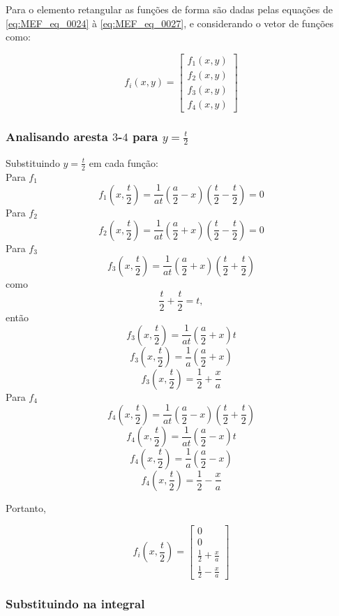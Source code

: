 \documentclass[
12pt,
a4paper,
oneside,
chapter=TITLE,
sumario=tradicional
]{abntex2}
\begin{document}
Para o elemento retangular as funções de forma são dadas pelas equações de \ref{eq:MEF_eq_0024} à \ref{eq:MEF_eq_0027}, e considerando o vetor de funções como:

$$  
f_i(x,y)=  
\begin{bmatrix}  
	f_1(x,y)\\  
	f_2(x,y)\\  
	f_3(x,y)\\  
	f_4(x,y)  
\end{bmatrix}  
$$ 

\subsubsection{Analisando aresta $3$-$4$ para $y = \frac{t}{2}$}

Substituindo $y=\frac{t}{2}$ em cada função:\\
Para $f_1$
$$  
f_1(x,\frac{t}{2})=\frac{1}{at}\left(\frac{a}{2}-x\right)\left(\frac{t}{2}-\frac{t}{2}\right)=0  
$$
Para $f_2$
$$  
f_2(x,\frac{t}{2})=\frac{1}{at}\left(\frac{a}{2}+x\right)\left(\frac{t}{2}-\frac{t}{2}\right)=0  
$$
Para $f_3$
$$  
f_3(x,\frac{t}{2})=\frac{1}{at}\left(\frac{a}{2}+x\right)\left(\frac{t}{2}+\frac{t}{2}\right)  
$$
como
$$  
\frac{t}{2}+\frac{t}{2}=t,  
$$
então
$$  
f_3(x,\frac{t}{2})=\frac{1}{at}\left(\frac{a}{2}+x\right)t  
$$
$$  
f_3(x,\frac{t}{2})=\frac{1}{a}\left(\frac{a}{2}+x\right)  
$$
$$  
f_3(x,\frac{t}{2})=\frac{1}{2}+\frac{x}{a}  
$$
Para $f_4$
$$  
f_4(x,\frac{t}{2})=\frac{1}{at}\left(\frac{a}{2}-x\right)\left(\frac{t}{2}+\frac{t}{2}\right)  
$$
$$  
f_4(x,\frac{t}{2})=\frac{1}{at}\left(\frac{a}{2}-x\right)t  
$$
$$  
f_4(x,\frac{t}{2})=\frac{1}{a}\left(\frac{a}{2}-x\right)  
$$
$$  
f_4(x,\frac{t}{2})=\frac{1}{2}-\frac{x}{a}  
$$

Portanto,

\begin{equation}
	f_i(x,\frac{t}{2})=  
	\begin{bmatrix}  
		0\\  
		0\\  
		\frac{1}{2}+\frac{x}{a}\\  
		\frac{1}{2}-\frac{x}{a}  
	\end{bmatrix}
	\label{eq:MEF_eq_0047}
\end{equation}

\subsubsection{Substituindo na integral}
\end{document}

